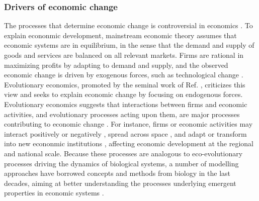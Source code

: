 \subsubsection*{Drivers of economic change}
The processes that determine economic change is controversial in economics \cite{Nelson2014}. 
To explain econonmic development, mainstream economic theory \cite{10.1093/cje/bet027} assumes that economic systems are in equilibrium, in the sense that the demand and supply of goods and services are balanced on all relevant markets. 
Firms are rational in maximizing profits by adapting to demand and supply, and the observed economic change is driven by exogenous forces, such as technological change \cite{Romer1986}. Evolutionary economics, promoted by the seminal work of Ref. \cite{Nelson2014}, criticizes this view and seeks to explain economic change by focusing on endogenous forces. 
% 
Evolutionary economics suggests that interactions between firms and economic activities, and evolutionary processes acting upon them, are major processes contributing to economic change \cite{Hodgson2019}.
% 
For instance, firms or economic activities may interact positively or negatively \cite{Wernerfelt1989,Pistorius2007Ozman2009,Saavedra2009a,Cohendet2018,Menon2015}, spread across space \cite{RogersEverettM2003DoI,Zahra2000}, and adapt \cite{Cordes2006} or transform into new econonmic institutions  \cite{Freeman2002,Hodgson2004,Aldrich2008}, affecting economic development at the regional and national scale.
%
% 
% 
Because these processes are analogous to eco-evolutionary processes driving the dynamics of biological systems, a number of modelling approaches have borrowed concepts and methods from biology in the last decades, aiming at better understanding the processes underlying emergent properties in economic systems \cite{Tacchella2018,Saavedra2009a,Scholl2020,Zhang2018,Modis1997,Saavedra2014,Farmer1999,Michalakelis2011,Marasco2016,Gatabazi2019,Cauwels56,Applegate2021,Suweis2015}. 

